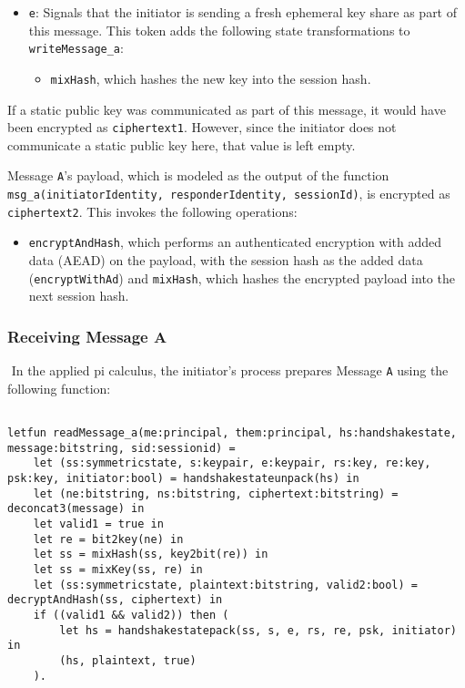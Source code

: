 \begin{itemize}

\item \texttt{e}: Signals that the initiator is sending a fresh ephemeral key share as part of this message. This token adds the following state transformations to \texttt{writeMessage\_a}:
\begin{itemize}

\item \texttt{mixHash}, which hashes the new key into the session hash.
\end{itemize}


\end{itemize}
If a static public key was communicated as part of this message, it would have been encrypted as \texttt{ciphertext1}. However, since the initiator does not communicate a static public key here, that value is left empty.


Message \texttt{A}'s payload, which is modeled as the output of the function \texttt{msg\_a(initiatorIdentity, responderIdentity, sessionId)}, is encrypted as \texttt{ciphertext2}. This invokes the following operations:


\begin{itemize}

\item \texttt{encryptAndHash}, which performs an authenticated encryption with added data (AEAD) on the payload, with the session hash as the added data (\texttt{encryptWithAd}) and \texttt{mixHash}, which hashes the encrypted payload into the next session hash.

\end{itemize}
\subsubsection{Receiving Message A}$ $
In the applied pi calculus, the initiator's process prepares Message \texttt{A} using the following function:


\begin{lstlisting}

letfun readMessage_a(me:principal, them:principal, hs:handshakestate, message:bitstring, sid:sessionid) =
	let (ss:symmetricstate, s:keypair, e:keypair, rs:key, re:key, psk:key, initiator:bool) = handshakestateunpack(hs) in
	let (ne:bitstring, ns:bitstring, ciphertext:bitstring) = deconcat3(message) in
	let valid1 = true in
	let re = bit2key(ne) in
	let ss = mixHash(ss, key2bit(re)) in
	let ss = mixKey(ss, re) in
	let (ss:symmetricstate, plaintext:bitstring, valid2:bool) = decryptAndHash(ss, ciphertext) in
	if ((valid1 && valid2)) then (
		let hs = handshakestatepack(ss, s, e, rs, re, psk, initiator) in
		(hs, plaintext, true)
	).

\end{lstlisting}

